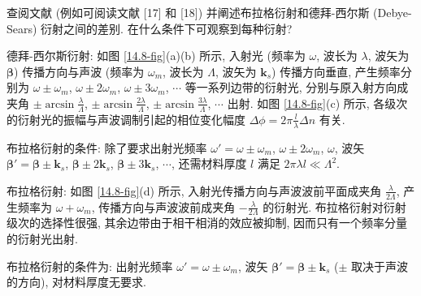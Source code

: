 \documentclass[twoside]{note}
\begin{document}
\begin{exe}
    查阅文献 (例如可阅读文献 [17] 和 [18]) 并阐述布拉格衍射和德拜-西尔斯 (Debye-Sears) 衍射之间的差别. 在什么条件下可观察到每种衍射?
\end{exe}
\begin{sol}
    德拜-西尔斯衍射: 如图 \ref{14.8-fig}(a)(b) 所示, 入射光 (频率为 $\omega$, 波长为 $\lambda$, 波矢为 $\bm{\beta}$) 传播方向与声波 (频率为 $\omega_m$, 波长为 $\Lambda$, 波矢为 $\bm{k}_s$) 传播方向垂直, 产生频率分别为 $\omega\pm\omega_m$, $\omega\pm 2\omega_m$, $\omega\pm 3\omega_m$, $\cdots$ 等一系列边带的衍射光, 分别与原入射方向成夹角 $\pm\arcsin\frac{\lambda}{\Lambda}$, $\pm\arcsin\frac{2\lambda}{\Lambda}$, $\pm\arcsin\frac{3\lambda}{\Lambda}$, $\cdots$ 出射. 如图 \ref{14.8-fig}(c) 所示, 各级次的衍射光的振幅与声波调制引起的相位变化幅度 $\Delta\phi=2\pi\frac{l}{\lambda}\Delta n$ 有关.

    布拉格衍射的条件: 除了要求出射光频率 $\omega'=\omega\pm\omega_m$, $\omega\pm 2\omega_m$, $\omega$, 波矢 $\bm{\beta}'=\bm{\beta}\pm\bm{k}_s$, $\bm{\beta}\pm 2\bm{k}_s$, $\bm{\beta}\pm 3\bm{k}_s$, $\cdots$, 还需材料厚度 $l$ 满足 $2\pi\lambda l\ll\Lambda^2$.

    布拉格衍射: 如图 \ref{14.8-fig}(d) 所示, 入射光传播方向与声波波前平面成夹角 $\frac{\lambda}{2\Lambda}$, 产生频率为 $\omega+\omega_m$, 传播方向与声波波前成夹角 $-\frac{\lambda}{2\Lambda}$ 的衍射光. 布拉格衍射对衍射级次的选择性很强, 其余边带由于相干相消的效应被抑制, 因而只有一个频率分量的衍射光出射.

    布拉格衍射的条件为: 出射光频率 $\omega'=\omega\pm\omega_m$, 波矢 $\bm{\beta}'=\bm{\beta}\pm\bm{k}_s$ ($\pm$ 取决于声波的方向), 对材料厚度无要求.


\end{sol}
\end{document}
